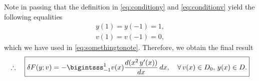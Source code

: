 \documentclass[12pt]{article}
\begin{document}
Note in passing that the definition 
in \eqref{eq:conditiony}
and \eqref{eq:conditionv}
yield the following equalities
\begin{align}
	y(1)=y(-1)=1, \\
	v(1)=v(-1)=0,
\end{align}
which we have used in \eqref{eq:somethingtonote}.
Therefore, we obtain the final result 
\begin{align}
	\therefore\quad\boxed{
		\delta F(y;v)
		=
		-\bigintsss_{-1}^{1}v(x)\frac{d(x^2\,y'(x))}{dx}\,dx,
		\quad
		\forall\, v(x)\in D_{0},\, y(x)\in D. 
	}
\end{align}
\end{document}

